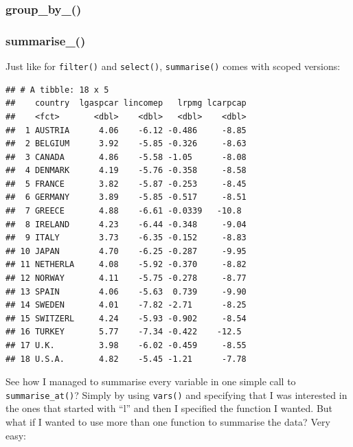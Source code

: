 \documentclass[]{gitbook}
\newenvironment{Shaded}{\begin{snugshade}}{\end{snugshade}}
\newcommand{\KeywordTok}[1]{\textcolor[rgb]{0.13,0.29,0.53}{\textbf{#1}}}
\newcommand{\NormalTok}[1]{#1}
\newcommand{\OperatorTok}[1]{\textcolor[rgb]{0.81,0.36,0.00}{\textbf{#1}}}
\newcommand{\StringTok}[1]{\textcolor[rgb]{0.31,0.60,0.02}{#1}}
\theoremstyle{definition}
\theoremstyle{definition}
\theoremstyle{definition}
\theoremstyle{remark}
\begin{document}
\hypertarget{group_by_}{%
\subsubsection{group\_by\_()}\label{group_by_}}

\hypertarget{summarise_}{%
\subsubsection{summarise\_()}\label{summarise_}}

Just like for \texttt{filter()} and \texttt{select()},
\texttt{summarise()} comes with scoped versions:

\begin{Shaded}
\end{Shaded}

\begin{verbatim}
## # A tibble: 18 x 5
##    country  lgaspcar lincomep   lrpmg lcarpcap
##    <fct>       <dbl>    <dbl>   <dbl>    <dbl>
##  1 AUSTRIA      4.06    -6.12 -0.486     -8.85
##  2 BELGIUM      3.92    -5.85 -0.326     -8.63
##  3 CANADA       4.86    -5.58 -1.05      -8.08
##  4 DENMARK      4.19    -5.76 -0.358     -8.58
##  5 FRANCE       3.82    -5.87 -0.253     -8.45
##  6 GERMANY      3.89    -5.85 -0.517     -8.51
##  7 GREECE       4.88    -6.61 -0.0339   -10.8 
##  8 IRELAND      4.23    -6.44 -0.348     -9.04
##  9 ITALY        3.73    -6.35 -0.152     -8.83
## 10 JAPAN        4.70    -6.25 -0.287     -9.95
## 11 NETHERLA     4.08    -5.92 -0.370     -8.82
## 12 NORWAY       4.11    -5.75 -0.278     -8.77
## 13 SPAIN        4.06    -5.63  0.739     -9.90
## 14 SWEDEN       4.01    -7.82 -2.71      -8.25
## 15 SWITZERL     4.24    -5.93 -0.902     -8.54
## 16 TURKEY       5.77    -7.34 -0.422    -12.5 
## 17 U.K.         3.98    -6.02 -0.459     -8.55
## 18 U.S.A.       4.82    -5.45 -1.21      -7.78
\end{verbatim}

See how I managed to summarise every variable in one simple call to
\texttt{summarise\_at()}? Simply by using \texttt{vars()} and specifying
that I was interested in the ones that started with ``l'' and then I
specified the function I wanted. But what if I wanted to use more than
one function to summarise the data? Very easy:
\end{document}
